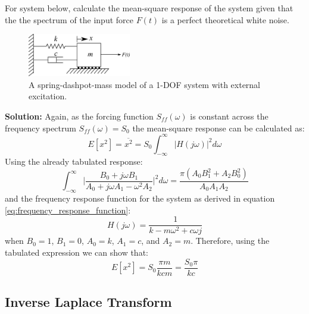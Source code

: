\documentclass[12pt,letter]{article}
\begin{document}
\begin{example}
	For system below, calculate the mean-square response of the system given that the the spectrum of the input force $F(t)$ is a perfect theoretical white noise.
	\begin{figure}[H]
		\centering
		\includegraphics[width=0.4\textwidth]{../figures/1-DOF-spring_dashpot_mass_horizontal_forced.png}
		\caption{A spring-dashpot-mass model of a 1-DOF system with external excitation.}
	\end{figure}
	\noindent\textbf{Solution:} Again, as the forcing function $S_{ff}(\omega)$ is constant across the frequency spectrum $S_{ff}(\omega)=S_0$ the mean-square response can be calculated as:
	\begin{equation}
		E[x^2] = \overline{x^2} =   S_{0} \int_{-\infty}^{\infty} |H(j\omega)|^2 d\omega
	\end{equation}
	Using the already tabulated response:
	\begin{equation}
		\int_{-\infty}^{\infty} \bigg|\frac{B_0 + j \omega B_1}{A_0+j \omega A_1 - \omega^2 A_2} \bigg|^2 d\omega = \frac{\pi (A_0 B_1^2 + A_2 B_0^2)}{A_0 A_1 A_2}
	\end{equation} 
	and the frequency response function for the system as derived in equation \ref{eq:frequency_response_function}:
	\begin{equation}
		H(j\omega) = \frac{1}{k-m\omega^2+c\omega j}
	\end{equation}
	when $B_0=1$, $B_1 = 0$, $A_0=k$, $A_1=c$, and $A_2 =m$. Therefore, using the tabulated expression we can show that:
	\begin{equation}
		E[x^2] = S_0 \frac{\pi m }{k c m} =  \frac{S_0 \pi}{k c}
	\end{equation} 
\end{example}			
			

\subsection{Inverse Laplace Transform} 
\end{document}

